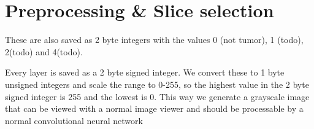 

\section{Preprocessing \& Slice selection}

These are also saved as 2 byte integers with the values 0 (not tumor), 1 (todo), 2(todo) and 4(todo).

Every layer is saved as a 2 byte signed integer. We convert these to 1 byte unsigned integers and scale the range to 0-255, so the highest value in the 2 byte signed integer is 255 and the lowest is 0.
This way we generate a grayscale image that can be viewed with a normal image viewer and should be processable by a normal convolutional neural network

